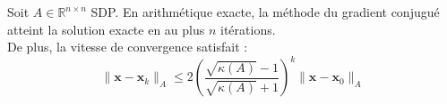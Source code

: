 \begin{theoreme}
Soit $A \in \mathbb{R}^{n \times n}$ SDP. En arithmétique exacte, la méthode du gradient conjugué atteint la solution exacte en au plus $n$ itérations. \\
De plus, la vitesse de convergence satisfait :
$$\|\mathbf{x} - \mathbf{x}_k\|_A \le 2 \left( \frac{\sqrt{\kappa(A)} - 1}{\sqrt{\kappa(A)} + 1} \right)^k \|\mathbf{x} - \mathbf{x}_0\|_A$$
\end{theoreme}